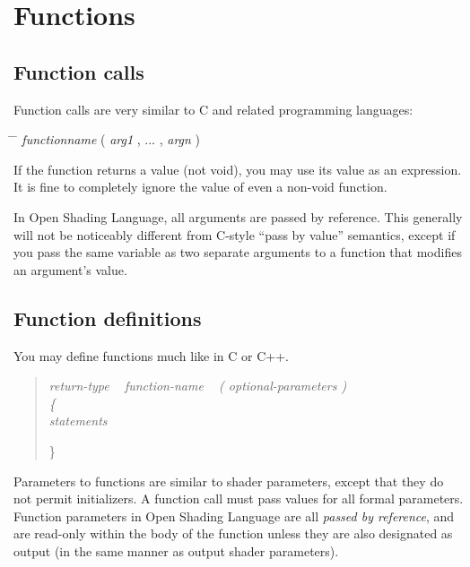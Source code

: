 \documentclass[11pt,letterpaper]{book}
\def\langname{Open Shading Language\xspace}
\def\void{{\cf void}\xspace}
\begin{document}
\section{Functions}
\label{sec:functions}

\subsection{Function calls}
\label{sec:syntax:functioncalls}

Function calls are very similar to C and related programming languages:

\begin{tabbing}
\hspace{0.5in} \= \hspace{0.3in} \= \kill
\> \emph{functionname} {\cf (} \emph{arg1} {\cf ,} ... {\cf ,} \emph{argn} {\cf )} \\
\end{tabbing}

If the function returns a value (not \void), you may use its value as
an expression.  It is fine to completely ignore the value of even
a non-\void function.

In \langname, all arguments are passed by reference.  This generally
will not be noticeably different from C-style ``pass by value''
semantics, except if you pass the same variable as two separate
arguments to a function that modifies an argument's value.


\subsection{Function definitions}
\label{sec:syntax:functiondefinitions}

You may define functions much like in C or C++.

\begin{quote}
\em
return-type ~ function-name ~ {\rm\cf (} optional-parameters {\rm\cf )} \\
\rm
{\cf \{ } \\
\em
\spc statements

{\cf \} }
\end{quote}

Parameters to functions are similar to shader parameters, except that
they do not permit initializers.  A function call must pass values for
all formal parameters.  Function parameters in \langname are all
\emph{passed by reference}, and are read-only within the body of the
function unless they are also designated as {\cf output} (in the same
manner as output shader parameters).
\end{document}
